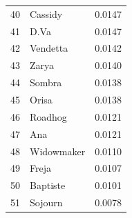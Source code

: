 \begin{tabular}{rlr}
40 & Cassidy & 0.0147 \\
41 & D.Va & 0.0147 \\
42 & Vendetta & 0.0142 \\
43 & Zarya & 0.0140 \\
44 & Sombra & 0.0138 \\
45 & Orisa & 0.0138 \\
46 & Roadhog & 0.0121 \\
47 & Ana & 0.0121 \\
48 & Widowmaker & 0.0110 \\
49 & Freja & 0.0107 \\
50 & Baptiste & 0.0101 \\
51 & Sojourn & 0.0078 \\
\bottomrule
\end{tabular}
